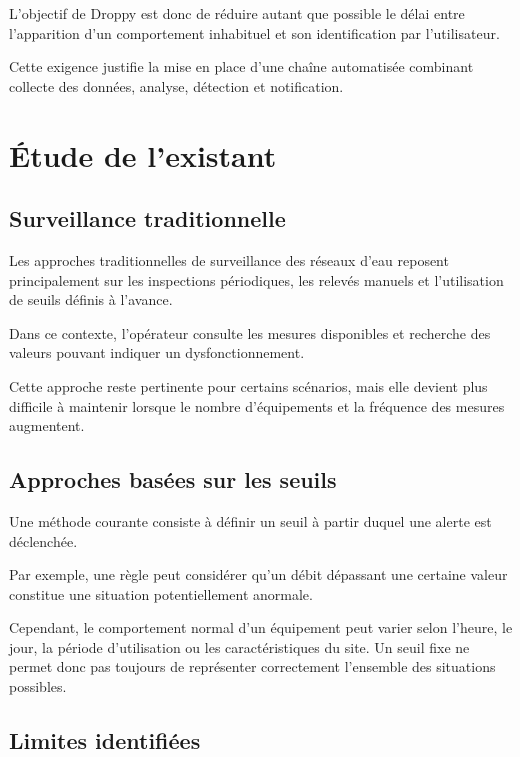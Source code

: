 L'objectif de Droppy est donc de réduire autant que possible le délai entre
l'apparition d'un comportement inhabituel et son identification par
l'utilisateur.

Cette exigence justifie la mise en place d'une chaîne automatisée combinant
collecte des données, analyse, détection et notification.


\section{Étude de l'existant}

\subsection{Surveillance traditionnelle}

Les approches traditionnelles de surveillance des réseaux d'eau reposent
principalement sur les inspections périodiques, les relevés manuels et
l'utilisation de seuils définis à l'avance.

Dans ce contexte, l'opérateur consulte les mesures disponibles et recherche
des valeurs pouvant indiquer un dysfonctionnement.

Cette approche reste pertinente pour certains scénarios, mais elle devient
plus difficile à maintenir lorsque le nombre d'équipements et la fréquence
des mesures augmentent.

\subsection{Approches basées sur les seuils}

Une méthode courante consiste à définir un seuil à partir duquel une alerte
est déclenchée.

Par exemple, une règle peut considérer qu'un débit dépassant une certaine
valeur constitue une situation potentiellement anormale.

Cependant, le comportement normal d'un équipement peut varier selon
l'heure, le jour, la période d'utilisation ou les caractéristiques du site.
Un seuil fixe ne permet donc pas toujours de représenter correctement
l'ensemble des situations possibles.

\subsection{Limites identifiées}

